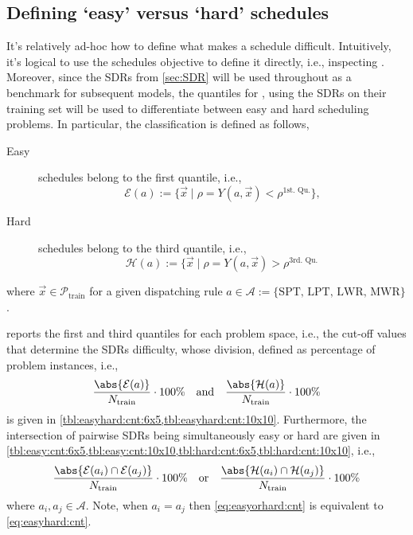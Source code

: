 \subsection{Defining `easy' versus `hard' schedules}\label{sec:diff:easyhard}
It's relatively ad-hoc how to define what makes a schedule difficult. Intuitively, it's logical to use the schedules objective to define it directly, i.e., inspecting \fullnamerho. Moreover, since the SDRs from \cref{sec:SDR} will be used throughout as a benchmark for subsequent models, the quantiles for \namerho, using the SDRs on their training set will be used to differentiate between easy and hard scheduling problems. In particular, the classification is defined as follows, 
\begin{description}
\item[Easy] schedules belong to the first quantile, i.e., \hfill \\
\begin{equation}\label{eq:easy}
\mathcal{E}(a):=\{\vec{x}\;|\;\rho=Y(a,\vec{x})<\rho^{\text{1st. Qu.}}\},
\end{equation} 
\item[Hard] schedules belong to the third quantile, i.e., \hfill \\
\begin{equation}\label{eq:hard}
\mathcal{H}(a):=\{\vec{x}\;|\;\rho=Y(a,\vec{x})>\rho^{\text{3rd. Qu.}}\,
\end{equation} 
\end{description}
where $\vec{x}\in\mathcal{P}_{\text{train}}$ for a given dispatching rule $a\in\mathcal{A}:=\{\text{SPT,~LPT,~LWR,~MWR}\}$.

 reports the first and third quantiles for each problem space, i.e., the cut-off values that determine the SDRs difficulty, whose division, defined as percentage of problem instances, i.e., 
\begin{equation}\label{eq:easyhard:cnt}
\frac{\abs{\mathcal{E}(a)}}{N_{\text{train}}} \cdot 100\%
\quad \text{and} \quad 
\frac{\abs{\mathcal{H}(a)}}{N_{\text{train}}}\cdot 100\%
\end{equation}
is given in \cref{tbl:easyhard:cnt:6x5,tbl:easyhard:cnt:10x10}. Furthermore, the intersection of pairwise SDRs being simultaneously easy or hard are given in \cref{tbl:easy:cnt:6x5,tbl:easy:cnt:10x10,tbl:hard:cnt:6x5,tbl:hard:cnt:10x10}, i.e., 
\begin{equation}\label{eq:easyorhard:cnt}
\frac{\abs{\mathcal{E}(a_i)\cap \mathcal{E}(a_j) }}{N_{\text{train}}} \cdot 100\%
\quad \text{or} \quad 
\frac{\abs{\mathcal{H}(a_i)\cap \mathcal{H}(a_j)}}{N_{\text{train}}}\cdot 100\%
\end{equation}
where $a_i,a_j\in\mathcal{A}$. Note, when $a_i=a_j$ then \cref{eq:easyorhard:cnt} is equivalent to \cref{eq:easyhard:cnt}.

